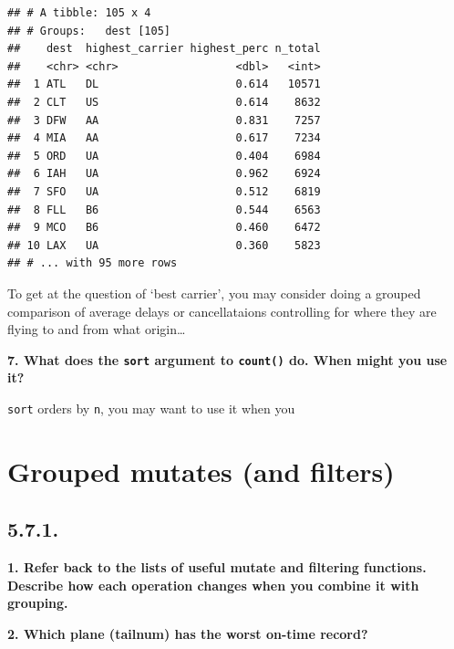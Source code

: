 \documentclass[]{book}
\theoremstyle{definition}
\theoremstyle{definition}
\theoremstyle{definition}
\theoremstyle{remark}
\begin{document}
\begin{verbatim}
## # A tibble: 105 x 4
## # Groups:   dest [105]
##    dest  highest_carrier highest_perc n_total
##    <chr> <chr>                  <dbl>   <int>
##  1 ATL   DL                     0.614   10571
##  2 CLT   US                     0.614    8632
##  3 DFW   AA                     0.831    7257
##  4 MIA   AA                     0.617    7234
##  5 ORD   UA                     0.404    6984
##  6 IAH   UA                     0.962    6924
##  7 SFO   UA                     0.512    6819
##  8 FLL   B6                     0.544    6563
##  9 MCO   B6                     0.460    6472
## 10 LAX   UA                     0.360    5823
## # ... with 95 more rows
\end{verbatim}

To get at the question of `best carrier', you may consider doing a
grouped comparison of average delays or cancellataions controlling for
where they are flying to and from what origin\ldots{}

\textbf{7. What does the \texttt{sort} argument to \texttt{count()} do.
When might you use it?}

\texttt{sort} orders by \texttt{n}, you may want to use it when you

\hypertarget{grouped-mutates-and-filters}{%
\section{Grouped mutates (and
filters)}\label{grouped-mutates-and-filters}}

\hypertarget{section-10}{%
\subsection{5.7.1.}\label{section-10}}

\textbf{1. Refer back to the lists of useful mutate and filtering
functions. Describe how each operation changes when you combine it with
grouping.}

\textbf{2. Which plane (tailnum) has the worst on-time record?}
\end{document}
